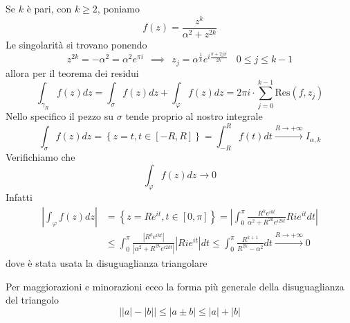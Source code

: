 Se $k$ è pari, con $k\geqslant 2$, poniamo
\begin{equation*}
f\left( z\right) =\frac{z^{k}}{\alpha ^{2} +z^{2k}}
\end{equation*}
Le singolarità si trovano ponendo
\begin{equation*}
z^{2k} =-\alpha ^{2} =\alpha ^{2} e^{\pi i} \ \ \implies \ \ z_{j} =\alpha ^{\frac{1}{k}} e^{i\frac{\pi +2j\pi }{2k}} \ \ \ \ 0\leqslant j\leqslant k-1
\end{equation*}
allora per il teorema dei residui
\begin{equation*}
\int _{\gamma _{R}} f\left( z\right) dz=\int _{\sigma } f\left( z\right) dz+\int _{\varphi } f\left( z\right) dz=2\pi i\cdotp \sum\limits ^{k-1}_{j=0}\mathrm{Res}\left( f,z_{j}\right)
\end{equation*}
Nello specifico il pezzo su $\sigma $ tende proprio al nostro integrale
\begin{equation*}
\int _{\sigma } f\left( z\right) dz=\left\{z=t,t\in \left[ -R,R\right]\right\} =\int ^{R}_{-R} f\left( t\right) dt\xrightarrow{R\rightarrow +\infty } I_{\alpha ,k}
\end{equation*}
Verifichiamo che
\begin{equation*}
\int _{\varphi } f\left( z\right) dz\rightarrow 0
\end{equation*}
Infatti
\begin{align*}
\left| \int _{\varphi } f\left( z\right) dz\right|  & =\left\{z=Re^{it} ,t\in \left[ 0,\pi \right]\right\} =\left| \int ^{\pi }_{0}\frac{R^{k} e^{ikt}}{\alpha ^{2} +R^{2k} e^{i2kt}} Rie^{it} dt\right| \\
 & \leqslant \int ^{\pi }_{0}\frac{\left| R^{k} e^{ikt}\right| }{\left| \alpha ^{2} +R^{2k} e^{i2kt}\right| }\left| Rie^{it}\right| dt\leqslant \int ^{\pi }_{0}\frac{R^{k+1}}{R^{2k} -\alpha ^{2}} dt\xrightarrow{R\rightarrow +\infty } 0
\end{align*}
dove è stata usata la disuguaglianza triangolare
\begin{rem}
 Per maggiorazioni e minorazioni ecco la forma più generale della disuguaglianza del triangolo
\begin{equation*}
\left| \left| a\right| -\left| b\right| \right| \leqslant \left| a\pm b\right| \leqslant \left| a\right| +\left| b\right| 
\end{equation*}
\end{rem}

